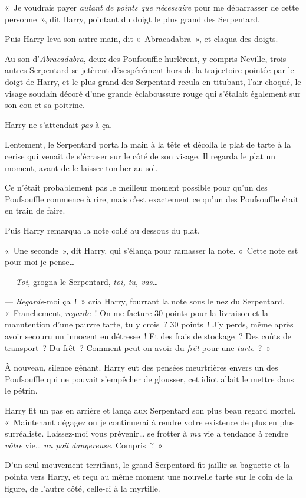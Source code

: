 «~Je voudrais payer \emph{autant de points que nécessaire} pour me débarrasser de cette personne~», dit Harry, pointant du doigt le plus grand des Serpentard.

Puis Harry leva son autre main, dit «~Abracadabra~», et claqua des doigts.

Au son d'\emph{Abracadabra}, deux des Poufsouffle hurlèrent, y compris Neville, trois autres Serpentard se jetèrent désespérément hors de la trajectoire pointée par le doigt de Harry, et le plus grand des Serpentard recula en titubant, l'air choqué, le visage soudain décoré d'une grande éclaboussure rouge qui s'étalait également sur son cou et sa poitrine.

Harry ne s'attendait \emph{pas} à ça.

Lentement, le Serpentard porta la main à la tête et décolla le plat de tarte à la cerise qui venait de s'écraser sur le côté de son visage.
Il regarda le plat un moment, avant de le laisser tomber au sol.

Ce n'était probablement pas le meilleur moment possible pour qu'un des Poufsouffle commence à rire, mais c'est exactement ce qu'un des Poufsouffle était en train de faire.

Puis Harry remarqua la note collé au dessous du plat.

«~Une seconde~», dit Harry, qui s'élança pour ramasser la note.
«~Cette note est pour moi je pense…

--- \emph{Toi,} grogna le Serpentard, \emph{toi, tu, vas…}

--- \emph{Regarde}-moi ça~!~» cria Harry, fourrant la note sous le nez du Serpentard.
«~Franchement, \emph{regarde}~!
On me facture 30 points pour la livraison et la manutention d'une pauvre tarte, tu y crois~?
30 points~!
J'y perds, même après avoir secouru un innocent en détresse~!
Et des frais de stockage~?
Des coûts de transport~?
Du frêt~?
Comment peut-on avoir du \emph{frêt} pour une \emph{tarte}~?~»

À nouveau, silence gênant.
Harry eut des pensées meurtrières envers un des Poufsouffle qui ne pouvait s'empêcher de glousser, cet idiot allait le mettre dans le pétrin.

Harry fit un pas en arrière et lança aux Serpentard son plus beau regard mortel.
«~Maintenant dégagez ou je continuerai à rendre votre existence de plus en plus surréaliste.
Laissez-moi vous prévenir… se frotter à \emph{ma} vie a tendance à rendre \emph{vôtre} vie… \emph{un poil dangereuse}. Compris~?~»

D'un seul mouvement terrifiant, le grand Serpentard fit jaillir sa baguette et la pointa vers Harry, et reçu au même moment une nouvelle tarte sur le coin de la figure, de l'autre côté, celle-ci à la myrtille.

